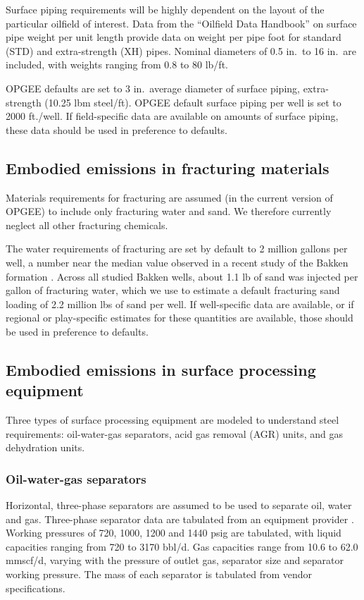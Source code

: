 \documentclass[11pt]{report}
\begin{document}
Surface piping requirements will be highly dependent on the layout of the particular oilfield of interest. Data from the ``Oilfield Data Handbook'' \cite[p.26]{Apex2010} on surface pipe weight per  unit length provide data on weight per pipe foot for standard (STD) and extra-strength (XH) pipes. Nominal diameters of 0.5 in.\ to 16 in.\ are included, with weights ranging from 0.8 to 80 lb/ft.

OPGEE defaults are set to 3 in.\ average  diameter of surface piping, extra-strength (10.25 lbm steel/ft). OPGEE default surface piping per well is set to 2000 ft./well. If field-specific data are available on amounts of surface piping, these data should be used in preference to defaults. 

\subsection{Embodied emissions in fracturing materials}

Materials requirements for fracturing are assumed (in the current version of OPGEE) to include only fracturing water and sand. We therefore currently neglect all other fracturing chemicals.

The water  requirements of fracturing are set by default to 2 million gallons per well, a number near the median value observed in a recent study of the Bakken formation \cite{Brandtetal2015}. Across all studied Bakken wells, about 1.1 lb of sand was injected per gallon of fracturing water, which we use to estimate a default fracturing sand loading of 2.2 million lbs of sand per well. If well-specific data are available, or if regional or play-specific estimates for these quantities are available, those should be used in preference to defaults.

\subsection{Embodied emissions in surface processing equipment}

Three types of surface processing equipment are modeled to understand steel requirements: oil-water-gas separators, acid gas removal (AGR) units, and gas dehydration units.

\subsubsection{Oil-water-gas separators}

Horizontal, three-phase separators are assumed to be used to separate oil, water and gas. Three-phase separator data are tabulated from an equipment provider \cite{Surfaceequip2014}. Working pressures of 720, 1000, 1200 and 1440 psig are tabulated, with liquid capacities ranging from 720 to 3170 bbl/d. Gas capacities range from 10.6 to 62.0 mmscf/d, varying with the pressure of outlet gas, separator size and separator working pressure. The mass of each separator is tabulated from vendor specifications.
\end{document}
